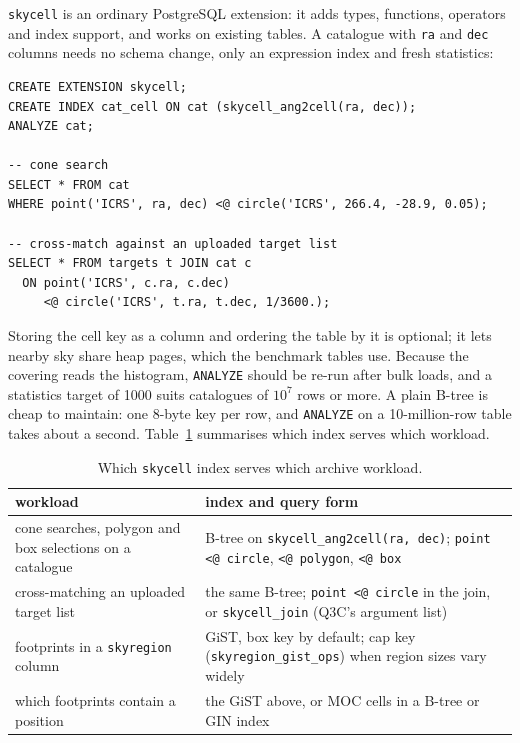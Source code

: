 \documentclass[preprint,12pt]{elsarticle}
\begin{document}
\texttt{skycell} is an ordinary PostgreSQL extension: it adds types, functions,
operators and index support, and works on existing tables. A catalogue with
\texttt{ra} and \texttt{dec} columns needs no schema change, only an expression index
and fresh statistics:
{\small
\begin{verbatim}
CREATE EXTENSION skycell;
CREATE INDEX cat_cell ON cat (skycell_ang2cell(ra, dec));
ANALYZE cat;

-- cone search
SELECT * FROM cat
WHERE point('ICRS', ra, dec) <@ circle('ICRS', 266.4, -28.9, 0.05);

-- cross-match against an uploaded target list
SELECT * FROM targets t JOIN cat c
  ON point('ICRS', c.ra, c.dec)
     <@ circle('ICRS', t.ra, t.dec, 1/3600.);
\end{verbatim}}
\noindent Storing the cell key as a column and ordering the table by it is optional; it lets
nearby sky share heap pages, which the benchmark tables use. Because the covering reads
the histogram, \texttt{ANALYZE} should be re-run after bulk loads, and a statistics
target of 1000 suits catalogues of $10^7$ rows or more. A plain B-tree is cheap to
maintain: one 8-byte key per row, and \texttt{ANALYZE} on a 10-million-row table takes
about a second. Table~\ref{tab:workloads} summarises which index serves which workload.

\begin{table}
  \caption{Which \texttt{skycell} index serves which archive workload.}
  \label{tab:workloads}
  \centering
  \footnotesize
  \begin{tabular}{@{}p{} p{}@{}}
    \hline\hline
    workload & index and query form \\
    \hline
    cone searches, polygon and box selections on a catalogue &
      B-tree on \texttt{skycell\_ang2cell(ra, dec)}; \texttt{point <@ circle},
      \texttt{<@ polygon}, \texttt{<@ box} \\[2pt]
    cross-matching an uploaded target list &
      the same B-tree; \texttt{point <@ circle} in the join, or
      \texttt{skycell\_join} (Q3C's argument list) \\[2pt]
    footprints in a \texttt{skyregion} column &
      GiST, box key by default; cap key (\texttt{skyregion\_gist\_ops}) when region
      sizes vary widely \\[2pt]
    which footprints contain a position &
      the GiST above, or MOC cells in a B-tree or GIN index \\
    \hline
  \end{tabular}
\end{table}
\end{document}
